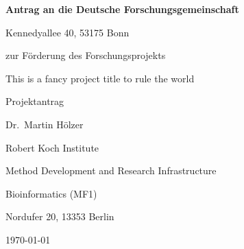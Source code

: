{

  \vspace*{20ex}

  \begin{center}
  \large

  {\bfseries Antrag an die Deutsche Forschungsgemeinschaft}

  Kennedyallee 40, 53175 Bonn

  \vspace{4ex}

  zur Förderung des Forschungsprojekts

  \vspace{9ex}

  \begin{bfseries}
    This is a fancy project title to rule the world
  \end{bfseries}

  \medskip

	 Projektantrag

  \vspace{9ex}

	Dr.\ Martin H\"olzer

 	Robert Koch Institute
  
 	Method Development and Research Infrastructure

  Bioinformatics (MF1)

	Nordufer 20, 13353 Berlin
	 
	\vspace{9ex}

	\today
  \end{center}
}

